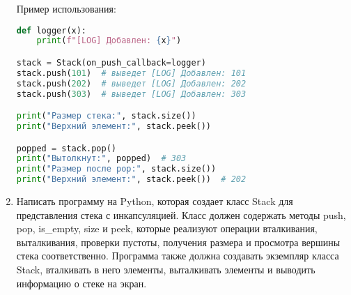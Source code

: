 \begin{enumerate}
Пример использования:
\begin{lstlisting}[language=Python]
def logger(x):
    print(f"[LOG] Добавлен: {x}")

stack = Stack(on_push_callback=logger)
stack.push(101)  # выведет [LOG] Добавлен: 101
stack.push(202)  # выведет [LOG] Добавлен: 202
stack.push(303)  # выведет [LOG] Добавлен: 303

print("Размер стека:", stack.size())
print("Верхний элемент:", stack.peek())

popped = stack.pop()
print("Вытолкнут:", popped)  # 303
print("Размер после pop:", stack.size())
print("Верхний элемент:", stack.peek())  # 202
\end{lstlisting}

\item Написать программу на Python, которая создает класс Stack для представления стека с инкапсуляцией. Класс должен содержать методы push, pop, is\_empty, size и peek, которые реализуют операции вталкивания, выталкивания, проверки пустоты, получения размера и просмотра вершины стека соответственно. Программа также должна создавать экземпляр класса Stack, вталкивать в него элементы, выталкивать элементы и выводить информацию о стеке на экран.


\end{enumerate}
